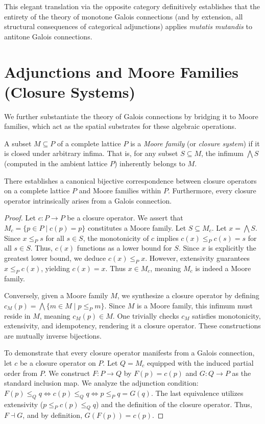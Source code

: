 This elegant translation via the opposite category definitively establishes that the entirety of the theory of monotone Galois connections (and by extension, all structural consequences of categorical adjunctions) applies \emph{mutatis mutandis} to antitone Galois connections.

\section{Adjunctions and Moore Families (Closure Systems)}

We further substantiate the theory of Galois connections by bridging it to Moore families, which act as the spatial substrates for these algebraic operations.
\begin{definition}
A subset $M \subseteq P$ of a complete lattice $P$ is a \emph{Moore family} (or \emph{closure system}) if it is closed under arbitrary infima. That is, for any subset $S \subseteq M$, the infimum $\bigwedge S$ (computed in the ambient lattice $P$) inherently belongs to $M$.
\end{definition}

\begin{theorem}
There establishes a canonical bijective correspondence between closure operators on a complete lattice $P$ and Moore families within $P$. Furthermore, every closure operator intrinsically arises from a Galois connection.
\end{theorem}
\begin{proof}
Let $c: P \to P$ be a closure operator. We assert that $M_c = \{ p \in P \mid c(p) = p \}$ constitutes a Moore family.
Let $S \subseteq M_c$. Let $x = \bigwedge S$. Since $x \leq_P s$ for all $s \in S$, the monotonicity of $c$ implies $c(x) \leq_P c(s) = s$ for all $s \in S$. Thus, $c(x)$ functions as a lower bound for $S$. Since $x$ is explicitly the greatest lower bound, we deduce $c(x) \leq_P x$. However, extensivity guarantees $x \leq_P c(x)$, yielding $c(x) = x$. Thus $x \in M_c$, meaning $M_c$ is indeed a Moore family.

Conversely, given a Moore family $M$, we synthesize a closure operator by defining $c_M(p) = \bigwedge \{ m \in M \mid p \leq_P m \}$. Since $M$ is a Moore family, this infimum must reside in $M$, meaning $c_M(p) \in M$. One trivially checks $c_M$ satisfies monotonicity, extensivity, and idempotency, rendering it a closure operator. These constructions are mutually inverse bijections.

To demonstrate that every closure operator manifests from a Galois connection, let $c$ be a closure operator on $P$. Let $Q = M_c$ equipped with the induced partial order from $P$. We construct $F: P \to Q$ by $F(p) = c(p)$ and $G: Q \to P$ as the standard inclusion map. We analyze the adjunction condition: $F(p) \leq_Q q \iff c(p) \leq_Q q \iff p \leq_P q = G(q)$. The last equivalence utilizes extensivity ($p \leq_P c(p) \leq_Q q$) and the definition of the closure operator. Thus, $F \dashv G$, and by definition, $G(F(p)) = c(p)$.
\end{proof}

